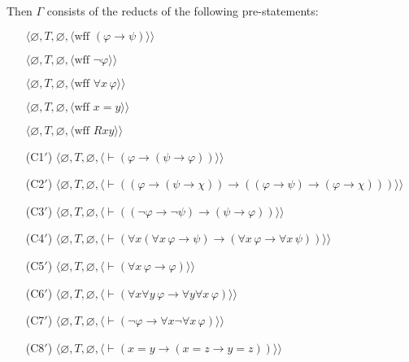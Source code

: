 \begin{itemize}
\noindent Then
  $\Gamma$ consists of the reducts of the following pre-statements:
    \begin{itemize}
      \item[] $\langle\varnothing,T,\varnothing,
               \langle \mbox{wff\ }(\varphi\to\psi)\rangle\rangle$
      \item[] $\langle\varnothing,T,\varnothing,
               \langle \mbox{wff\ }\lnot\varphi\rangle\rangle$
      \item[] $\langle\varnothing,T,\varnothing,
               \langle \mbox{wff\ }\forall x\,\varphi\rangle\rangle$
      \item[] $\langle\varnothing,T,\varnothing,
               \langle \mbox{wff\ }x=y\rangle\rangle$
      \item[] $\langle\varnothing,T,\varnothing,
               \langle \mbox{wff\ }Rxy\rangle\rangle$
      \item[(C1$'$)] $\langle\varnothing,T,\varnothing,
               \langle \vdash(\varphi\to(\psi\to\varphi))
               \rangle\rangle$
      \item[(C2$'$)] $\langle\varnothing,T,
               \varnothing,
               \langle \vdash((\varphi\to(\psi\to\chi))\to
               ((\varphi\to\psi)\to(\varphi\to\chi)))
               \rangle\rangle$
      \item[(C3$'$)] $\langle\varnothing,T,
               \varnothing,
               \langle \vdash((\lnot\varphi\to\lnot\psi)\to
               (\psi\to\varphi))\rangle\rangle$
      \item[(C4$'$)] $\langle\varnothing,T,
               \varnothing,
               \langle \vdash(\forall x(\forall x\,\varphi\to\psi)\to
                 (\forall x\,\varphi\to\forall x\,\psi))\rangle\rangle$
      \item[(C5$'$)] $\langle\varnothing,T,
               \varnothing,
               \langle \vdash(\forall x\,\varphi\to\varphi)\rangle\rangle$
      \item[(C6$'$)] $\langle\varnothing,T,
               \varnothing,
               \langle \vdash(\forall x\forall y\,\varphi\to
                 \forall y\forall x\,\varphi)\rangle\rangle$
      \item[(C7$'$)] $\langle\varnothing,T,
               \varnothing,
               \langle \vdash(\lnot\varphi\to\forall x\lnot\forall x\,\varphi
                 )\rangle\rangle$
      \item[(C8$'$)] $\langle\varnothing,T,
               \varnothing,
               \langle \vdash(x=y\to(x=z\to y=z))\rangle\rangle$

\end{itemize}
\end{itemize}
